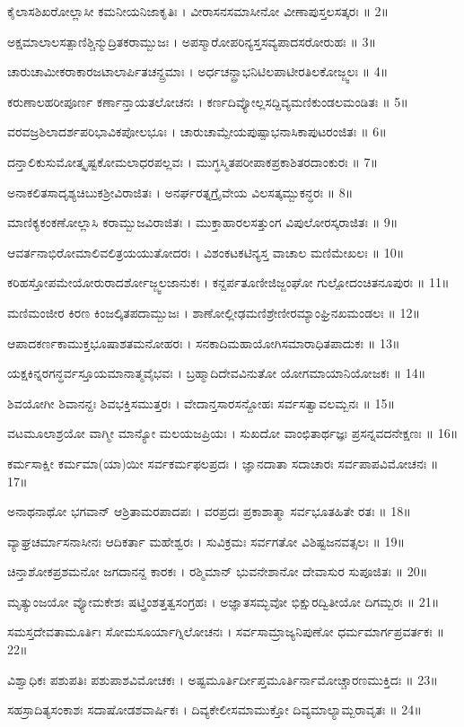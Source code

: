 ಕೈಲಾಸಶಿಖರೋಲ್ಲಾಸೀ ಕಮನೀಯನಿಜಾಕೃತಿಃ ।
ವೀರಾಸನಸಮಾಸೀನೋ ವೀಣಾಪುಸ್ತಲಸತ್ಕರಃ ॥ 2॥

ಅಕ್ಷಮಾಲಾಲಸತ್ಪಾಣಿಶ್ಚಿನ್ಮುದ್ರಿತಕರಾಮ್ಬುಜಃ ।
ಅಪಸ್ಮಾರೋಪರಿನ್ಯಸ್ತಸವ್ಯಪಾದಸರೋರುಹಃ ॥ 3॥

ಚಾರುಚಾಮೀಕರಾಕಾರಜಟಾಲಾರ್ಪಿತಚನ್ದ್ರಮಾಃ ।
ಅರ್ಧಚನ್ದ್ರಾಭನಿಟಿಲಪಾಟೀರತಿಲಕೋಜ್ಜ್ವಲಃ ॥ 4॥

ಕರುಣಾಲಹರೀಪೂರ್ಣ ಕರ್ಣಾನ್ತಾಯತಲೋಚನಃ ।
ಕರ್ಣದಿವ್ಯೋಲ್ಲಸದ್ದಿವ್ಯಮಣಿಕುಂಡಲಮಂಡಿತಃ ॥ 5॥

ವರವಜ್ರಶಿಲಾದರ್ಶಪರಿಭಾವಿಕಪೋಲಭೂಃ ।
ಚಾರುಚಾಮ್ಪೇಯಪುಷ್ಪಾಭನಾಸಿಕಾಪುಟರಂಜಿತಃ ॥ 6॥

ದನ್ತಾಲಿಕುಸುಮೋತ್ಕೃಷ್ಟಕೋಮಲಾಧರಪಲ್ಲವಃ ।
ಮುಗ್ಧಸ್ಮಿತಪರೀಪಾಕಪ್ರಕಾಶಿತರದಾಂಕುರಃ ॥ 7॥

ಅನಾಕಲಿತಸಾದೃಶ್ಯಚಿಬುಕಶ್ರೀವಿರಾಜಿತಃ ।
ಅನರ್ಘರತ್ನಗ್ರೈವೇಯ ವಿಲಸತ್ಕಮ್ಬುಕನ್ಧರಃ ॥ 8॥

ಮಾಣಿಕ್ಯಕಂಕಣೋಲ್ಲಾಸಿ ಕರಾಮ್ಬುಜವಿರಾಜಿತಃ ।
ಮುಕ್ತಾಹಾರಲಸತ್ತುಂಗ ವಿಪುಲೋರಸ್ಕರಾಜಿತಃ ॥ 9॥

ಆವರ್ತನಾಭಿರೋಮಾಲಿವಲಿತ್ರಯಯುತೋದರಃ ।
ವಿಶಂಕಟಕಟಿನ್ಯಸ್ತ ವಾಚಾಲ ಮಣಿಮೇಖಲಃ ॥ 10॥

ಕರಿಹಸ್ತೋಪಮೇಯೋರುರಾದರ್ಶೋಜ್ಜ್ವಲಜಾನುಕಃ ।
ಕನ್ದರ್ಪತೂಣೀಜಿಜ್ಜಂಘೋ ಗುಲ್ಪೋದಂಚಿತನೂಪುರಃ ॥ 11॥

ಮಣಿಮಂಜೀರ ಕಿರಣ ಕಿಂಜಲ್ಕಿತಪದಾಮ್ಬುಜಃ ।
ಶಾಣೋಲ್ಲೀಢಮಣಿಶ್ರೇಣೀರಮ್ಯಾಂಘ್ರಿನಖಮಂಡಲಃ ॥ 12॥

ಆಪಾದಕರ್ಣಕಾಮುಕ್ತಭೂಷಾಶತಮನೋಹರಃ ।
ಸನಕಾದಿಮಹಾಯೋಗಿಸಮಾರಾಧಿತಪಾದುಕಃ ॥ 13॥

ಯಕ್ಷಕಿನ್ನರಗನ್ಧರ್ವಸ್ತೂಯಮಾನಾತ್ಮವೈಭವಃ ।
ಬ್ರಹ್ಮಾದಿದೇವವಿನುತೋ ಯೋಗಮಾಯಾನಿಯೋಜಕಃ ॥ 14॥

ಶಿವಯೋಗೀ ಶಿವಾನನ್ದಃ ಶಿವಭಕ್ತಿಸಮುತ್ತರಃ ।
ವೇದಾನ್ತಸಾರಸನ್ದೋಹಃ ಸರ್ವಸತ್ವಾವಲಮ್ಬನಃ ॥ 15॥

ವಟಮೂಲಾಶ್ರಯೋ ವಾಗ್ಮೀ ಮಾನ್ಯೋ ಮಲಯಜಪ್ರಿಯಃ ।
ಸುಖದೋ ವಾಂಛಿತಾರ್ಥಜ್ಞಃ ಪ್ರಸನ್ನವದನೇಕ್ಷಣಃ ॥ 16॥

ಕರ್ಮಸಾಕ್ಷೀ ಕರ್ಮಮಾ(ಯಾ)ಯೀ ಸರ್ವಕರ್ಮಫಲಪ್ರದಃ ।
ಜ್ಞಾನದಾತಾ ಸದಾಚಾರಃ ಸರ್ವಪಾಪವಿಮೋಚನಃ ॥ 17॥

ಅನಾಥನಾಥೋ ಭಗವಾನ್ ಆಶ್ರಿತಾಮರಪಾದಪಃ ।
ವರಪ್ರದಃ ಪ್ರಕಾಶಾತ್ಮಾ ಸರ್ವಭೂತಹಿತೇ ರತಃ ॥ 18॥

ವ್ಯಾಘ್ರಚರ್ಮಾಸನಾಸೀನಃ ಆದಿಕರ್ತಾ ಮಹೇಶ್ವರಃ ।
ಸುವಿಕ್ರಮಃ ಸರ್ವಗತೋ ವಿಶಿಷ್ಟಜನವತ್ಸಲಃ ॥ 19॥

ಚಿನ್ತಾಶೋಕಪ್ರಶಮನೋ ಜಗದಾನನ್ದ ಕಾರಕಃ ।
ರಶ್ಮಿಮಾನ್ ಭುವನೇಶಾನೋ ದೇವಾಸುರ ಸುಪೂಜಿತಃ ॥ 20॥

ಮೃತ್ಯುಂಜಯೋ ವ್ಯೋಮಕೇಶಃ ಷಟ್ತ್ರಿಂಶತ್ತತ್ವಸಂಗ್ರಹಃ ।
ಅಜ್ಞಾತಸಮ್ಭವೋ ಭಿಕ್ಷುರದ್ವಿತೀಯೋ ದಿಗಮ್ಬರಃ ॥ 21॥

ಸಮಸ್ತದೇವತಾಮೂರ್ತಿಃ ಸೋಮಸೂರ್ಯಾಗ್ನಿಲೋಚನಃ ।
ಸರ್ವಸಾಮ್ರಾಜ್ಯನಿಪುಣೋ ಧರ್ಮಮಾರ್ಗಪ್ರವರ್ತಕಃ ॥ 22॥

ವಿಶ್ವಾಧಿಕಃ ಪಶುಪತಿಃ ಪಶುಪಾಶವಿಮೋಚಕಃ ।
ಅಷ್ಟಮೂರ್ತಿರ್ದೀಪ್ತಮೂರ್ತಿರ್ನಾಮೋಚ್ಚಾರಣಮುಕ್ತಿದಃ ॥ 23॥

ಸಹಸ್ರಾದಿತ್ಯಸಂಕಾಶಃ ಸದಾಷೋಡಶವಾರ್ಷಿಕಃ ।
ದಿವ್ಯಕೇಲೀಸಮಾಮುಕ್ತೋ ದಿವ್ಯಮಾಲ್ಯಾಮ್ಬರಾವೃತಃ ॥ 24॥


